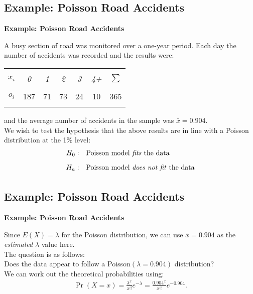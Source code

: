 \documentclass[compress]{beamer}        %
\makeatletter
\newcommand{\tcb}{\textcolor{beamer@blendedblue}}
\makeatother
\begin{document}
\subsection{Example: Poisson Road Accidents}
\begin{frame}{\bf \tcb{Example: Poisson Road Accidents}}

A busy section of road was monitored over a one-year period. Each day the number of accidents was recorded and the results were:\\[0.6cm]
\begin{center}
\begin{tabular}{|c|ccccc|c|}
\hline
&&&&&&\\[-0.3cm]
$x_i$      & \emph{0} & \emph{1} & \emph{2} & \emph{3} & \emph{4+} & $\sum$ \\[0.1cm]
\hline
&&&&&&\\[-0.3cm]
$o_i$ & 187 & 71 & 73 & 24 & 10 & 365\\[0.1cm]
\hline
\multicolumn{7}{c}{}
\end{tabular}
\end{center}
and the average number of accidents in the sample was $\bar x = 0.904$.\\[0.4cm]


We wish to test the hypothesis that the above results are in line with a Poisson distribution at the 1\% level:\\[-0.2cm]
\begin{align*}
H_0: \quad & \text{Poisson model \emph{fits} the data}\\[0.2cm]
H_a: \quad & \text{Poisson model \emph{does not fit} the data}\\[0.1cm]
\end{align*}

\end{frame}







\subsection{Example: Poisson Road Accidents}
\begin{frame}{\bf \tcb{Example: Poisson Road Accidents}}

Since $E(X) = \lambda$ for the Poisson distribution, we can use $\bar x = 0.904$ as the \emph{estimated} $\lambda$ value here.\\[1cm]

The question is as follows:\\[0.2cm]
Does the data appear to follow a Poisson$(\lambda = 0.904)$ distribution?\\[1cm]

We can work out the theoretical probabilities using:
\begin{align*}
\Pr(X=x) = \frac{\lambda^x}{x\,!}e^{-\lambda} = \frac{0.904^x}{x\,!}e^{-0.904}.
\end{align*}

\end{frame}
\end{document}
